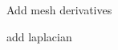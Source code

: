 
\begin{DoxyRefList}
\item[\label{todo__todo000001}%
\hypertarget{todo__todo000001}{}%
Module \hyperlink{namespacemirana}{mirana} ]Add mesh derivatives 

add laplacian 
\end{DoxyRefList}